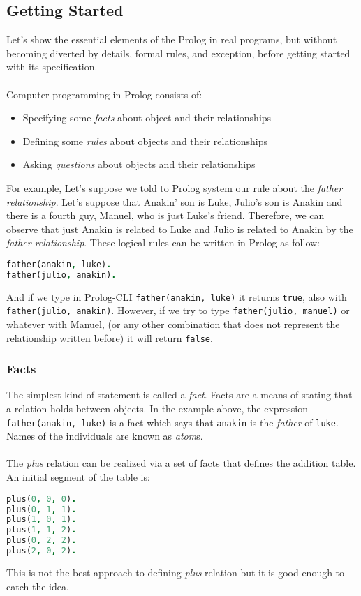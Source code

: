 \documentclass{report}
\theoremstyle{definition}
\theoremstyle{definition}
\newcommand{\ttt}[1]{\texttt{#1}}
\begin{document}
\subsection{Getting Started}
Let's show the essential elements of the Prolog in real programs, but without becoming diverted by details, formal rules, and exception, before getting started with its specification.\\\\
Computer programming in Prolog consists of:
\begin{itemize}
	\item Specifying some \textit{facts} about object and their relationships
	\item Defining some \textit{rules} about objects and their relationships
	\item Asking \textit{questions} about objects and their relationships
\end{itemize}

For example, Let's suppose we told to Prolog system our rule about the \textit{father relationship}. Let's suppose that Anakin' son is Luke, Julio's son is Anakin and there is a fourth guy, Manuel, who is just Luke's friend. Therefore, we can observe that just Anakin is related to Luke and Julio is related to Anakin by the \textit{father relationship}. These logical rules can be written in Prolog as follow:
\begin{lstlisting}[language=Prolog, caption=Father Relationship]
father(anakin, luke).
father(julio, anakin).
\end{lstlisting}
And if we type in Prolog-CLI \ttt{father(anakin, luke)} it returns \ttt{true}, also with \ttt{father(julio, anakin)}. However, if we try to type \ttt{father(julio, manuel)} or whatever with Manuel, (or any other combination that does not represent the relationship written before) it will return \ttt{false}.
\subsubsection{Facts}
The simplest kind of statement is called a \textit{fact}. Facts are a means of stating that a relation holds between objects. In the example above, the expression \ttt{father(anakin, luke)} is a fact which says that \ttt{anakin} is the \textit{father} of \ttt{luke}. Names of the individuals are known as \textit{atom}s.\\\\
The \textit{plus} relation can be realized via a set of facts that defines the addition table. An initial segment of the table is:
\begin{lstlisting}[language=Prolog, caption=Plus Relationship]
plus(0, 0, 0).
plus(0, 1, 1).
plus(1, 0, 1).
plus(1, 1, 2).
plus(0, 2, 2).
plus(2, 0, 2).
\end{lstlisting}
This is not the best approach to defining \textit{plus} relation but it is good enough to catch the idea.
\end{document}
